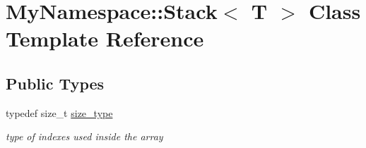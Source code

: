\hypertarget{class_my_namespace_1_1_stack}{}\section{My\+Namespace\+:\+:Stack$<$ T $>$ Class Template Reference}
\label{class_my_namespace_1_1_stack}
\subsection*{Public Types}
\begin{DoxyCompactItemize}
\item 
\mbox{\label{class_my_namespace_1_1_stack_a19c43f92e11d91ed645058833af88a86}} 
typedef size\+\_\+t \hyperlink{class_my_namespace_1_1_stack_a19c43f92e11d91ed645058833af88a86}{size\+\_\+type}
\begin{DoxyCompactList}\small\item\em type of indexes used inside the array \end{DoxyCompactList}\end{DoxyCompactItemize}

